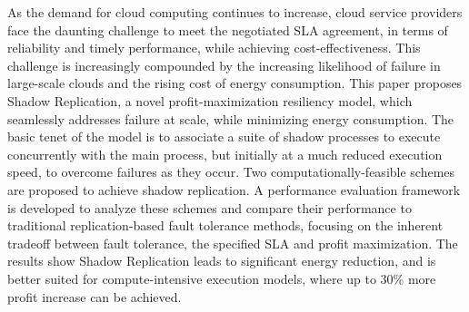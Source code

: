 As the demand for cloud computing continues to increase, cloud service
providers face the daunting challenge to meet the negotiated SLA
agreement, in terms of reliability and timely performance, while
achieving cost-effectiveness. This challenge is increasingly
compounded by the increasing likelihood of failure in large-scale
clouds and the rising cost of energy consumption.  This paper proposes
Shadow Replication, a novel profit-maximization resiliency model,
which seamlessly addresses failure at scale, while minimizing energy
consumption. The basic tenet of the model is to associate a suite of
shadow processes to execute concurrently with the main process, but
initially at a much reduced execution speed, to overcome failures as
they occur. Two computationally-feasible schemes are proposed to
achieve shadow replication. A performance evaluation framework is
developed to analyze these schemes and compare their performance to
traditional replication-based fault tolerance methods, focusing on the
inherent tradeoff between fault tolerance, the specified SLA and
profit maximization. The results show Shadow Replication leads to
significant energy reduction, and is better suited for
compute-intensive execution models, where up to 30\% more profit
increase can be achieved.










